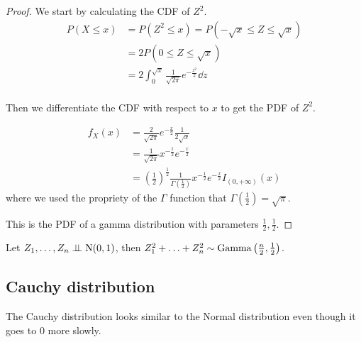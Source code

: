 \documentclass[12pt]{extarticle}
\newcommand{\Normal}{{\operatorfont N}}
\newcommand{\GammaD}{{\operatorfont Gamma}}
\begin{document}
\begin{proof}
    We start by calculating the CDF of $Z^2$.
    \begin{align}
        P(X \leq x) & = P(Z^2 \leq x) = P(-\sqrt{x} \leq Z \leq \sqrt{x})                  \\
                    & = 2P(0 \leq Z \leq \sqrt{x})                                         \\
                    & = 2\int_0^{\sqrt{x}} \frac{1}{\sqrt{2\pi}} e^{-\frac{z^2}{2}} \dd{z} \\
    \end{align}

    Then we differentiate the CDF with respect to $x$ to get the PDF of $Z^2$.

    \begin{align}
        f_X(x) & = \frac{2}{\sqrt{2\pi}} e^{-\frac{x}{2}} \frac{1}{2\sqrt{x}}                                                                          \\
               & = \frac{1}{\sqrt{2\pi}} x^{-\frac{1}{2}} e^{-\frac{x}{2}}                                                                             \\
               & = \left(\frac{1}{2}\right)^\frac{1}{2} \frac{1}{\Gamma\left(\frac{1}{2}\right)} x^{-\frac{1}{2}} e^{-\frac{x}{2}} I_{(0, +\infty)}(x)
    \end{align}
    where we used the propriety of the $\Gamma$ function that $\Gamma\left(\frac{1}{2}\right) = \sqrt{\pi}$.

    This is the PDF of a gamma distribution with parameters $\frac{1}{2}, \frac{1}{2}$.
\end{proof}

\begin{lemma}
    Let $Z_1, \ldots, Z_n \indep \Normal(0, 1)$, then $Z_1^2 + \ldots + Z_n^2 \sim \GammaD\left(\frac{n}{2}, \frac{1}{2}\right)$.
\end{lemma}

\subsection{Cauchy distribution}

The Cauchy distribution looks similar to the Normal distribution even though it goes to $0$ more slowly.
\end{document}
